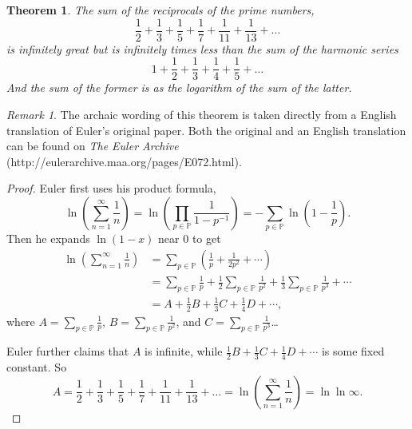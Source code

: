 \documentclass[a4paper]{article}
\newtheorem{theorem}{Theorem}[section]
\theoremstyle{definition}
\theoremstyle{remark}
\newtheorem*{remark}{Remark}
\begin{document}
\begin{theorem}
  The sum of the reciprocals of the prime numbers,
  \[
  \frac{1}{2}+\frac{1}{3}+\frac{1}{5}+\frac{1}{7}+\frac{1}{11}+\frac{1}{13}+\dots
  \]
  is infinitely great but is infinitely times less than the sum of the harmonic series
  \[
  1+\frac{1}{2}+\frac{1}{3}+\frac{1}{4}+\frac{1}{5}+\dots
  \]
  And the sum of the former is as the logarithm of the sum of the latter.
  \label{thm:EulerReciprocalOfPrimes}
\end{theorem}
\begin{remark}
  The archaic wording of this theorem is taken directly from a English translation of Euler's original paper\cite{bib:Euler}. Both the original and an English translation can be found on \textit{The Euler Archive} (http://eulerarchive.maa.org/pages/E072.html).
\end{remark}
\begin{proof}
  Euler first uses his product formula,
  \[
  \ln\left( \sum_{n=1}^\infty\frac{1}{n} \right)=\ln\left( \prod_{p\in\mathbb{P}}\frac{1}{1-p^{-1}} \right)=-\sum_{p\in\mathbb{P}}\ln\left( 1-\frac{1}{p} \right)
  .
  \]
  Then he expands $\ln(1-x)$ near $0$ to get
  \begin{align*}
    \ln\left( \sum_{n=1}^\infty\frac{1}{n} \right)&=\sum_{p\in\mathbb{P}}\left( \frac{1}{p}+\frac{1}{2p^2}+\cdots \right)\\
    &=\sum_{p\in\mathbb{P}}\frac{1}{p}+\frac{1}{2}\sum_{p\in\mathbb{P}}\frac{1}{p^2}+\frac{1}{3}\sum_{p\in\mathbb{P}}\frac{1}{p^3}+\cdots\\
    &=A+\frac{1}{2}B+\frac{1}{3}C+\frac{1}{4}D+\cdots
    ,
  \end{align*}
  where $\displaystyle A=\sum_{p\in\mathbb{P}}\frac{1}{p}$, $\displaystyle B=\sum_{p\in\mathbb{P}}\frac{1}{p^2}$, and $\displaystyle C=\sum_{p\in\mathbb{P}}\frac{1}{p^3}$\dots

  Euler further claims that $A$ is infinite, while $\frac{1}{2}B+\frac{1}{3}C+\frac{1}{4}D+\cdots$ is some fixed constant. So 
  \[
  A=\frac{1}{2}+\frac{1}{3}+\frac{1}{5}+\frac{1}{7}+\frac{1}{11}+\frac{1}{13}+\dots=\ln \left( \sum_{n=1}^\infty\frac{1}{n} \right) = \ln\ln\infty
  .
  \]
\end{proof}
\end{document}
